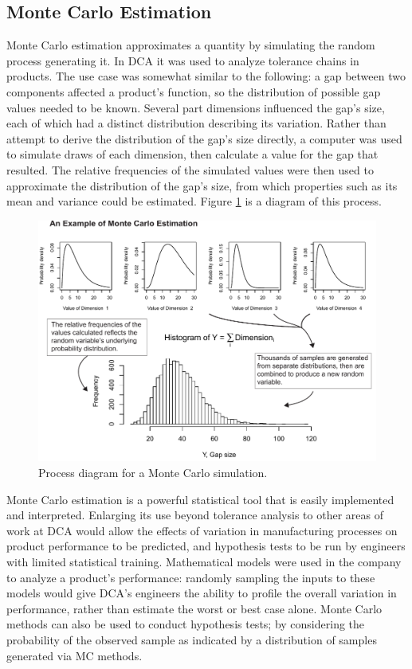 \documentclass[11pt,a4paper,article]{memoir} %
\begin{document}
\subsection*{Monte Carlo Estimation}
Monte Carlo estimation approximates a quantity by simulating the random process generating it. In DCA it was used to analyze tolerance chains in products. The use case was somewhat similar to the following: a gap between two components affected a product's function, so the distribution of possible gap values needed to be known. Several part dimensions influenced the gap's size, each of which had a distinct distribution describing its variation. Rather than attempt to derive the distribution of the gap's size directly, a computer was used to simulate draws of each dimension, then calculate a value for the gap that resulted. The relative frequencies of the simulated values were then used to approximate the distribution of the gap's size, from which properties such as its mean and variance could be estimated. Figure \ref{fig:monte_carlo} is a diagram of this process.
\begin{figure}[h!]
\includegraphics[width=1\textwidth]{MC_estimation.pdf}
\caption{Process diagram for a Monte Carlo simulation.}
\label{fig:monte_carlo}
\end{figure}

Monte Carlo estimation is a powerful statistical tool that is easily implemented and interpreted. Enlarging its use beyond tolerance analysis to other areas of work at DCA would allow the effects of variation in manufacturing processes on product performance to be predicted, and hypothesis tests to be run by engineers with limited statistical training. Mathematical models were used in the company to analyze a product's performance: randomly sampling the inputs to these models would give DCA's engineers the ability to profile the overall variation in performance, rather than estimate the worst or best case alone. Monte Carlo methods can also be used to conduct hypothesis tests; by considering the probability of the observed sample as indicated by a distribution of samples generated via MC methods.
\end{document}
